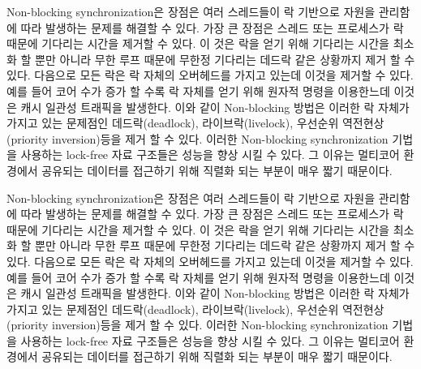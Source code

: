 Non-blocking synchronization은 장점은 여러 스레드들이 락 기반으로 자원을 관리함에 따라
 발생하는 문제를 해결할 수 있다. 
가장 큰 장점은 스레드 또는 프로세스가 락 때문에 기다리는 시간을 제거할 수 있다.
이 것은 락을 얻기 위해 기다리는 시간을 최소화 할 뿐만 아니라 무한 루프 때문에 무한정 기다리는 
데드락 같은 상황까지 제거 할 수 있다. 
다음으로 모든 락은 락 자체의 오버헤드를 가지고 있는데 이것을 제거할 수 있다. 
예를 들어 코어 수가 증가 할 수록 락 자체를 얻기 위해 원자적 명령을 이용한느데 이것은 캐시 일관성 트래픽을 
발생한다. 
이와 같이 Non-blocking 방법은 이러한 락 자체가 가지고 있는 문제점인 데드락(deadlock), 라이브락(livelock), 
우선순위 역전현상(priority inversion)등을 제거 할 수 있다. 
이러한 Non-blocking synchronization 기법을 사용하는 lock-free 자료 구조들은 성능을 향상 시킬 수 있다. 
그 이유는 멀티코어 환경에서 공유되는 데이터를 접근하기 위해 직렬화 되는 부분이 매우 짧기 때문이다. 


Non-blocking synchronization은 장점은 여러 스레드들이 락 기반으로 자원을 관리함에 따라
 발생하는 문제를 해결할 수 있다. 
가장 큰 장점은 스레드 또는 프로세스가 락 때문에 기다리는 시간을 제거할 수 있다.
이 것은 락을 얻기 위해 기다리는 시간을 최소화 할 뿐만 아니라 무한 루프 때문에 무한정 기다리는 
데드락 같은 상황까지 제거 할 수 있다. 
다음으로 모든 락은 락 자체의 오버헤드를 가지고 있는데 이것을 제거할 수 있다. 
예를 들어 코어 수가 증가 할 수록 락 자체를 얻기 위해 원자적 명령을 이용한느데 이것은 캐시 일관성 트래픽을 
발생한다. 
이와 같이 Non-blocking 방법은 이러한 락 자체가 가지고 있는 문제점인 데드락(deadlock), 라이브락(livelock), 
우선순위 역전현상(priority inversion)등을 제거 할 수 있다. 
이러한 Non-blocking synchronization 기법을 사용하는 lock-free 자료 구조들은 성능을 향상 시킬 수 있다. 
그 이유는 멀티코어 환경에서 공유되는 데이터를 접근하기 위해 직렬화 되는 부분이 매우 짧기 때문이다. 




